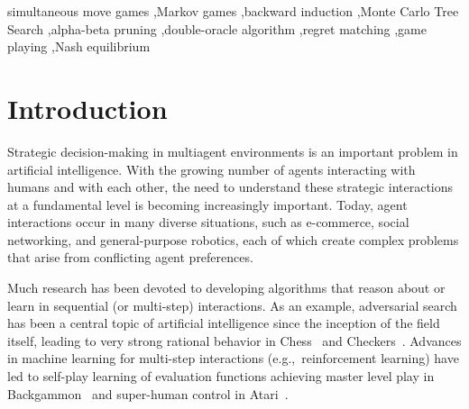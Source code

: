 \documentclass[preprint,12pt]{elsarticle}
\newcommand{\eg}{{e.g.,}~}
\newcounter{mlNoteCounter}
\newcounter{bbNoteCounter}
\newcommand{\mlanctot}[1]{{\small \color{darkgreen} $\blacksquare$ \refstepcounter{mlNoteCounter}\textsf{[ML]$_{\arabic{mlNoteCounter}}$:{#1}}}}
\newcommand{\bbosansky}[1]{{\small \color{orange} $\blacktriangle$ \refstepcounter{bbNoteCounter}\textsf{[BB]$_{\arabic{bbNoteCounter}}$:{#1}}}}
\begin{document}
\begin{frontmatter}
\begin{keyword}
simultaneous move games \sep Markov games \sep backward induction \sep Monte Carlo Tree Search \sep alpha-beta pruning \sep double-oracle algorithm \sep regret matching \sep game playing \sep Nash equilibrium

\end{keyword}

\end{frontmatter}





\section{Introduction}
\label{sec:intro}

Strategic decision-making in multiagent environments is an important problem in artificial intelligence.
With the growing number of agents interacting with humans and with each other, the need to
understand these strategic interactions at a fundamental level is becoming increasingly important.
Today, agent interactions occur in many diverse situations, such as e-commerce, social networking, and
general-purpose robotics, each of which create complex problems that arise from conflicting agent
preferences.

Much research has been devoted to developing algorithms that reason about or learn in sequential (or multi-step)
interactions. As an example, adversarial search has been a central topic of artificial intelligence
since the inception of the field itself, leading to very strong rational behavior in
Chess~\cite{Campbell02deepblue} and Checkers~\cite{Schaeffer96chinook}. Advances in machine learning for multi-step interactions
(\eg reinforcement learning) have led to self-play learning of evaluation functions achieving master level play
in Backgammon~\cite{Tesauro95TDGammon} and super-human control in Atari~\cite{mnih-dqn-2015}.
\end{document}
